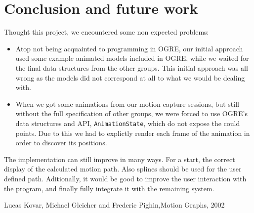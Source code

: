\documentclass[a4paper]{article}
\begin{document}
\section{Conclusion and future work}

Thought this project, we encountered some non expected problems:
\begin{itemize}
	\item Atop not being acquainted to programming in OGRE, our initial approach used some example animated models included in OGRE, while we waited for the final data structures from the other groups. This initial approach was all wrong as the models did not correspond at all to what we would be dealing with.
	\item When we got some animations from our motion capture sessions, but still without the full specification of other groups, we were forced to use OGRE's data structures and API, \texttt{AnimationState}, which do not expose the could points. Due to this we had to explictly render each frame of the animation in order to discover its positions.
\end{itemize}


The implementation can still improve in many ways. For a start, the correct display of the calculated motion path. Also splines should be used for the user defined path. Aditionally, it would be good to improve the user interaction with the program, and finally fully integrate it with the remaining system.





\begin{thebibliography}{}

{Lucas Kovar, Michael Gleicher and Frederic Pighin},{Motion Graphs}, {2002}
    
    
\end{thebibliography} 
\end{document}
